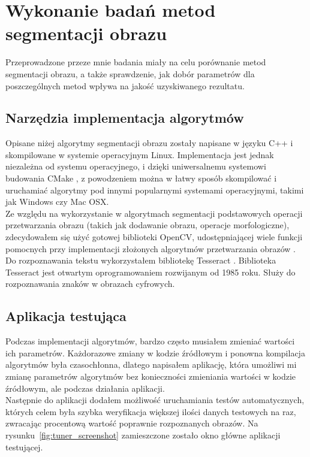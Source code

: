 \section{Wykonanie badań metod segmentacji obrazu}
Przeprowadzone przeze mnie badania miały na celu porównanie metod segmentacji obrazu, a także sprawdzenie, jak dobór parametrów dla poszczególnych metod wpływa na jakość uzyskiwanego rezultatu.

\subsection{Narzędzia implementacja algorytmów}
Opisane niżej algorytmy segmentacji obrazu zostały napisane w języku C++ i skompilowane w systemie operacyjnym Linux. Implementacja jest jednak niezależna od systemu operacyjnego, i dzięki uniwersalnemu systemowi budowania CMake \cite{cmake}, z powodzeniem można w łatwy sposób skompilować i uruchamiać algorytmy pod innymi popularnymi systemami operacyjnymi, takimi jak Windows czy Mac OSX.\\
Ze względu na wykorzystanie w algorytmach segmentacji podstawowych operacji przetwarzania obrazu (takich jak dodawanie obrazu, operacje morfologiczne), zdecydowałem się użyć gotowej biblioteki OpenCV, udostępniającej wiele funkcji pomocnych przy implementacji złożonych algorytmów przetwarzania obrazów \cite{opencv}\cite{dawsonhowe14}.\\
Do rozpoznawania tekstu wykorzystałem bibliotekę Tesseract \cite{tesseract}. Biblioteka Tesseract jest otwartym oprogramowaniem rozwijanym od 1985 roku. Służy do rozpoznawania znaków w obrazach cyfrowych.
\subsection{Aplikacja testująca}
Podczas implementacji algorytmów, bardzo często musiałem zmieniać wartości ich parametrów. Każdorazowe zmiany w kodzie źródłowym i ponowna kompilacja algorytmów była czasochłonna, dlatego napisałem aplikację, która umożliwi mi zmianę parametrów algorytmów bez konieczności zmieniania wartości w kodzie źródłowym, ale podczas działania aplikacji.\\
Następnie do aplikacji dodałem możliwość uruchamiania testów automatycznych, których celem była szybka weryfikacja większej ilości danych testowych na raz, zwracając procentową wartość poprawnie rozpoznanych obrazów. Na rysunku~\ref{fig:tuner_screenshot} zamieszczone zostało okno główne aplikacji testującej.


